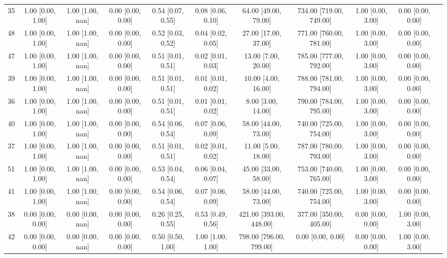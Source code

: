 \documentclass[8pt]{article}
\begin{document}
\begin{center}
\begin{footnotesize}
\begin{longtable}{|ccccccccccc|}
 35 &  1.00 [0.00, 1.00] &  1.00 [1.00, nan] &  0.00 [0.00, 0.00] &  0.54 [0.07, 0.55] &  0.08 [0.06, 0.10] &     64.00 [49.00, 79.00] &  734.00 [719.00, 749.00] &  1.00 [0.00, 3.00] &  0.00 [0.00, 0.00] \\
 48 &  1.00 [0.00, 1.00] &  1.00 [1.00, nan] &  0.00 [0.00, 0.00] &  0.52 [0.03, 0.52] &  0.04 [0.02, 0.05] &     27.00 [17.00, 37.00] &  771.00 [760.00, 781.00] &  1.00 [0.00, 3.00] &  0.00 [0.00, 0.00] \\
 47 &  1.00 [0.00, 1.00] &  1.00 [1.00, nan] &  0.00 [0.00, 0.00] &  0.51 [0.01, 0.51] &  0.02 [0.01, 0.03] &      13.00 [7.00, 20.00] &  785.00 [777.00, 792.00] &  1.00 [0.00, 3.00] &  0.00 [0.00, 0.00] \\
 39 &  1.00 [0.00, 1.00] &  1.00 [1.00, nan] &  0.00 [0.00, 0.00] &  0.51 [0.01, 0.51] &  0.01 [0.01, 0.02] &      10.00 [4.00, 16.00] &  788.00 [781.00, 794.00] &  1.00 [0.00, 3.00] &  0.00 [0.00, 0.00] \\
 36 &  1.00 [0.00, 1.00] &  1.00 [1.00, nan] &  0.00 [0.00, 0.00] &  0.51 [0.01, 0.51] &  0.01 [0.01, 0.02] &       8.00 [3.00, 14.00] &  790.00 [784.00, 795.00] &  1.00 [0.00, 3.00] &  0.00 [0.00, 0.00] \\
 40 &  1.00 [0.00, 1.00] &  1.00 [1.00, nan] &  0.00 [0.00, 0.00] &  0.54 [0.06, 0.54] &  0.07 [0.06, 0.09] &     58.00 [44.00, 73.00] &  740.00 [725.00, 754.00] &  1.00 [0.00, 3.00] &  0.00 [0.00, 0.00] \\
 37 &  1.00 [0.00, 1.00] &  1.00 [1.00, nan] &  0.00 [0.00, 0.00] &  0.51 [0.01, 0.51] &  0.02 [0.01, 0.02] &      11.00 [5.00, 18.00] &  787.00 [780.00, 793.00] &  1.00 [0.00, 3.00] &  0.00 [0.00, 0.00] \\
 51 &  1.00 [0.00, 1.00] &  1.00 [1.00, nan] &  0.00 [0.00, 0.00] &  0.53 [0.04, 0.54] &  0.06 [0.04, 0.07] &     45.00 [33.00, 58.00] &  753.00 [740.00, 765.00] &  1.00 [0.00, 3.00] &  0.00 [0.00, 0.00] \\
 41 &  1.00 [0.00, 1.00] &  1.00 [1.00, nan] &  0.00 [0.00, 0.00] &  0.54 [0.06, 0.54] &  0.07 [0.06, 0.09] &     58.00 [44.00, 73.00] &  740.00 [725.00, 754.00] &  1.00 [0.00, 3.00] &  0.00 [0.00, 0.00] \\
 38 &  0.00 [0.00, 0.00] &  0.00 [0.00, nan] &  0.00 [0.00, 0.00] &  0.26 [0.25, 0.55] &  0.53 [0.49, 0.56] &  421.00 [393.00, 448.00] &  377.00 [350.00, 405.00] &  0.00 [0.00, 0.00] &  1.00 [0.00, 3.00] \\
 42 &  0.00 [0.00, 0.00] &  0.00 [0.00, nan] &  0.00 [0.00, 0.00] &  0.50 [0.50, 1.00] &  1.00 [1.00, 1.00] &  798.00 [796.00, 799.00] &        0.00 [0.00, 0.00] &  0.00 [0.00, 0.00] &  1.00 [0.00, 3.00] \\

\end{longtable}
\end{footnotesize}
\end{center}
\end{document}
